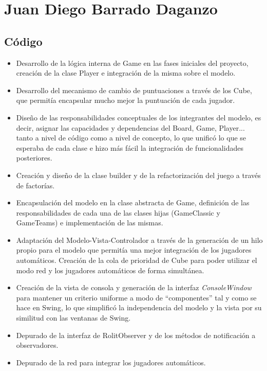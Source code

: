 \documentclass[../FINAL/Scrum/SCRUM.tex]{subfiles}
\begin{document}
\section{Juan Diego Barrado Daganzo}
\subsection*{Código}
\begin{itemize}

\item Desarrollo de la lógica interna de Game en las fases iniciales del proyecto, creación de la clase Player e integración de la misma sobre el modelo.

\item Desarrollo del mecanismo de cambio de puntuaciones a través de los Cube, que permitía encapsular mucho mejor la puntuación de cada jugador.

\item Diseño de las responsabilidades conceptuales de los integrantes del modelo, es decir, asignar las capacidades y dependencias del Board, Game, Player... tanto a nivel de código como a nivel de concepto, lo que unificó lo que se esperaba de cada clase e hizo más fácil la integración de funcionalidades posteriores.

\item Creación y diseño de la clase builder y de la refactorización del juego a través de factorías.

\item Encapsulación del modelo en la clase abstracta de Game, definición de las responsabilidades de cada una de las clases hijas (GameClassic y GameTeams) e implementación de las mismas.

\item Adaptación del Modelo-Vista-Controlador a través de la generación de un hilo propio para el modelo que permitía una mejor integración de los jugadores automáticos. Creación de la cola de prioridad de Cube para poder utilizar el modo red y los jugadores automáticos de forma simultánea.

\item Creación de la vista de consola y generación de la interfaz \textit{ConsoleWindow} para mantener un criterio uniforme a modo de ``componentes'' tal y como se hace en Swing, lo que simplificó la independencia del modelo y la vista por su similitud con las ventanas de Swing.

\item Depurado de la interfaz de RolitObserver y de los métodos de notificación a observadores.

\item Depurado de la red para integrar los jugadores automáticos.
\end{itemize}
\end{document}
